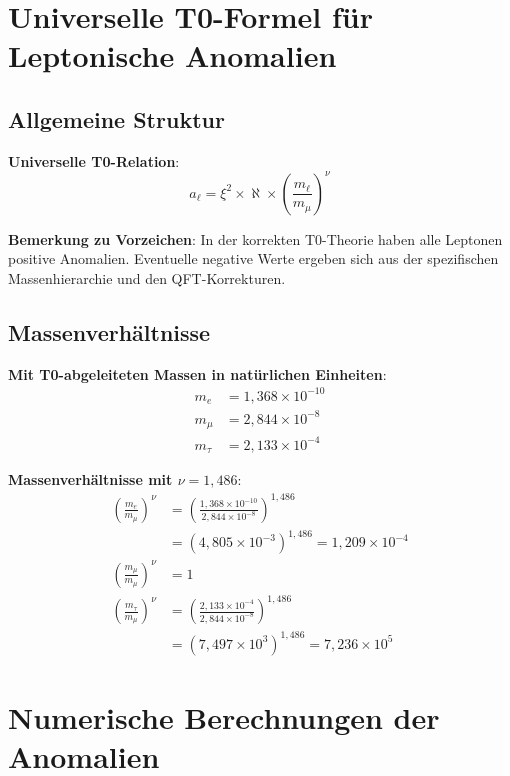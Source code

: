 \documentclass[12pt,a4paper]{article}
\newcommand{\xipar}{\xi}
\newcommand{\nulep}{\nu}
\begin{document}
	\section{Universelle T0-Formel für Leptonische Anomalien}
	
	\subsection{Allgemeine Struktur}
	
	\textbf{Universelle T0-Relation}:
	\begin{equation}
		a_\ell = \xipar^2 \times \aleph \times \left(\frac{m_\ell}{m_\mu}\right)^\nulep
	\end{equation}
	
	\textbf{Bemerkung zu Vorzeichen}: In der korrekten T0-Theorie haben alle Leptonen positive Anomalien. Eventuelle negative Werte ergeben sich aus der spezifischen Massenhierarchie und den QFT-Korrekturen.
	
	\subsection{Massenverhältnisse}
	
	\textbf{Mit T0-abgeleiteten Massen in natürlichen Einheiten}:
	\begin{align}
		m_e &= 1{,}368 \times 10^{-10} \\
		m_\mu &= 2{,}844 \times 10^{-8} \\
		m_\tau &= 2{,}133 \times 10^{-4}
	\end{align}
	
	\textbf{Massenverhältnisse mit $\nulep = 1{,}486$}:
	\begin{align}
		\left(\frac{m_e}{m_\mu}\right)^\nulep &= \left(\frac{1{,}368 \times 10^{-10}}{2{,}844 \times 10^{-8}}\right)^{1{,}486} \\
		&= (4{,}805 \times 10^{-3})^{1{,}486} = 1{,}209 \times 10^{-4} \\
		\left(\frac{m_\mu}{m_\mu}\right)^\nulep &= 1 \\
		\left(\frac{m_\tau}{m_\mu}\right)^\nulep &= \left(\frac{2{,}133 \times 10^{-4}}{2{,}844 \times 10^{-8}}\right)^{1{,}486} \\
		&= (7{,}497 \times 10^3)^{1{,}486} = 7{,}236 \times 10^5
	\end{align}
	
	\section{Numerische Berechnungen der Anomalien}
	
\end{document}
